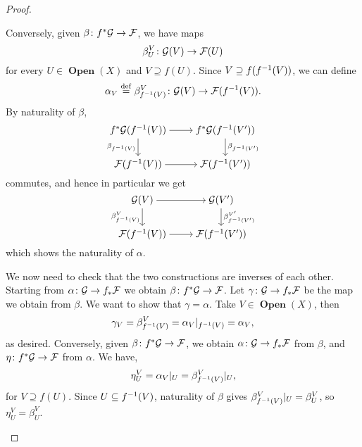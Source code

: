 \documentclass{article}
\DeclareMathOperator{\Open}{\mathbf{Open}}
\begin{document}
\begin{proof}
\begin{itemize}
              Conversely, given $\beta \colon f^*\mathcal{G} \to \mathcal{F}$, we have maps
              \begin{equation*}
                  \beta_U^V \colon \mathcal{G}(V) \to \mathcal{F}(U)
              \end{equation*}
              for every $U \in \Open(X)$ and $V \supseteq f(U)$.
              Since $V \supseteq f(f^{-1}(V))$, we can define
              \begin{equation*}
                  \alpha_V \overset{\mathrm{def}}{=} \beta_{f^{-1}(V)}^V \colon \mathcal{G}(V) \to \mathcal{F}(f^{-1}(V)).
              \end{equation*}
              By naturality of $\beta$,
              \begin{equation*}
                  \begin{tikzcd}[cramped]
                      f^*\mcG(f\inv(V)) \dar["\beta_{f\inv(V)}"'] \rar
                      & f^*\mcG(f\inv(V')) \dar["\beta_{f\inv(V')}"]\\
                      \mcF(f\inv(V))  \rar & \mcF(f\inv(V'))
                  \end{tikzcd}
              \end{equation*}
              commutes, and hence in particular we get
              \begin{equation*}
                  \begin{tikzcd}[cramped]
                      \mcG(V) \dar["\beta^{V}_{f\inv(V)}"'] \rar
                      & \mcG(V') \dar["\beta^{V'}_{f\inv(V')}"]\\
                      \mcF(f\inv(V))  \rar & \mcF(f\inv(V'))
                  \end{tikzcd}
              \end{equation*}
              which shows the naturality of $\alpha$.

              We now need to check that the two constructions are inverses
              of each other. Starting from $\alpha \colon \mathcal{G} \to f_* \mathcal{F}$
              we obtain $\beta \colon f^*\mathcal{G} \to \mathcal{F}$.
              Let $\gamma\colon \mathcal{G} \to f_* \mathcal{F}$ be the map we obtain
              from $\beta$. We want to show that $\gamma = \alpha$.
              Take $V \in \Open(X)$, then
              \begin{equation*}
                  \gamma_V = \beta_{f^{-1}(V)}^V = \alpha_V|_{f^{-1}(V)} = \alpha_V,
              \end{equation*}
              as desired. Conversely, given $\beta \colon f^*\mathcal{G} \to \mathcal{F}$,
              we obtain $\alpha \colon \mathcal{G} \to f_* \mathcal{F}$ from $\beta$, and
              $\eta \colon f^*\mathcal{G} \to \mathcal{F}$ from $\alpha$. We have,
              \begin{equation*}
                  \eta_U^V = \alpha_V |_U = \beta_{f^{-1}(V)}^V |_U,
              \end{equation*}
              for $V \supseteq f(U)$. Since $U \subseteq f^{-1}(V)$,
              naturality of $\beta$ gives $\beta_{f^{-1}(V)}^V |_U = \beta_U^V$,
              so $\eta_U^V = \beta_U^V$.


\end{itemize}
\end{proof}
\end{document}
